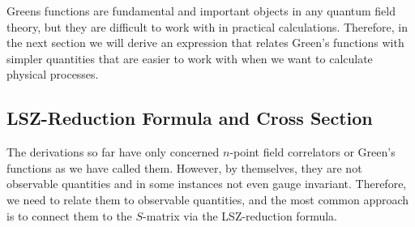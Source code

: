 
Greens functions are fundamental and important objects in any quantum field theory, but they are difficult to work with in practical calculations. Therefore, in the next section we will derive an expression that relates Green's functions with simpler quantities that are easier to work with when we want to calculate physical processes.  
\subsection{LSZ-Reduction Formula and Cross Section}\label{sec:LSZ and Cross section}
The derivations so far have only concerned $n$-point field correlators or Green's functions as we have called them. However, by themselves, they are not observable quantities and in some instances not even gauge invariant. Therefore, we need to relate them to observable quantities, and the most common approach is to connect them to the $S$-matrix via the LSZ-reduction formula.



